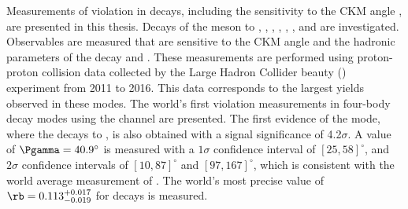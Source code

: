 
Measurements of \CP violation in \btodkst decays, including the sensitivity to the CKM angle \Pgamma, are presented in this thesis. Decays of the \Dz meson to \Km\pip, \Km\Kp, \pim\pip, \pim\Kp, \Km\pip\pim\pip, \pim\pip\pim\pip, and \pim\Kp\pim\pip are investigated. Observables are measured that are sensitive to the CKM angle \Pgamma and the hadronic parameters of the decay \rb and \deltab. These measurements are performed using proton-proton collision data collected by the Large Hadron Collider beauty (\lhcb) experiment from 2011 to 2016. This data corresponds to the largest yields observed in these modes. The world's first \CP violation measurements in four-body \Dz decay modes using the \btodkst channel are presented. The first evidence of the \btodkst mode, where the \Dz decays to \pim\Kp, is also obtained with a signal significance of 4.2$\sigma$. A value of $\Pgamma = 40.9^{\circ}$ is measured with a $1\sigma$ confidence interval of $[25, 58]^{\circ}$, and $2\sigma$ confidence intervals of $[10, 87]^{\circ}$ and $[97,167]^{\circ}$, which is consistent with the world average measurement of \Pgamma. The world's most precise value of $\rb = 0.113^{+0.017}_{-0.019}$ for \btodkst decays is measured.
